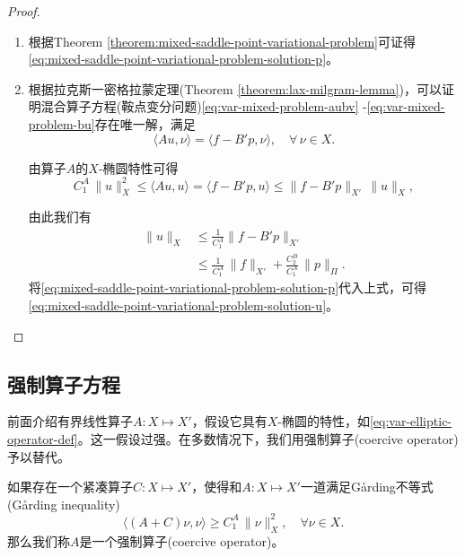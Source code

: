 \begin{proof}
  \begin{enumerate}
    \item 根据Theorem \ref{theorem:mixed-saddle-point-variational-problem}可证得\eqref{eq:mixed-saddle-point-variational-problem-solution-p}。
    \item 根据拉克斯一密格拉蒙定理(Theorem \ref{theorem:lax-milgram-lemma})，可以证明混合算子方程(鞍点变分问题)\eqref{eq:var-mixed-problem-aubv}
  -\eqref{eq:var-mixed-problem-bu}存在唯一解，满足
  \begin{equation*}
    \langle A u, \nu \rangle = \langle f - B' p, \nu \rangle, \quad \forall \, \nu \in X.
  \end{equation*}

  由算子$A$的$X$-椭圆特性可得
  \begin{equation*}
    C_1^A \, \big\|u\big\|_{X}^2 \le \langle Au, u \rangle = \langle f - B'p, u \rangle \le \big\| f - B' p \big\|_{X'} \, \big\|u \big\|_{X},
  \end{equation*}

  由此我们有
  \begin{equation*}
    \begin{split}
      \big\| u \big\|_{X} & \le \frac{1}{C_1^A}  \big\| f - B' p \big\|_{X'} \\
      & \le \frac{1}{C_1^A} \, \big\| f \big\|_{X'} + \frac{C_2^B}{C_1^A} \, \big\| p \big\|_{\Pi}.
    \end{split}
  \end{equation*}
  将\eqref{eq:mixed-saddle-point-variational-problem-solution-p}代入上式，可得\eqref{eq:mixed-saddle-point-variational-problem-solution-u}。
\end{enumerate}
\end{proof}

\subsection{强制算子方程}
\label{sec:var-coercive}
前面介绍有界线性算子$A:X \mapsto X'$，假设它具有$X$-椭圆的特性，如\eqref{eq:var-elliptic-operator-def}。这一假设过强。在多数情况下，我们用强制算子(coercive operator)予以替代。

\begin{definition}[强制算子]
  \label{definitiuon:var-coercive-def}
  如果存在一个紧凑算子$C:X \mapsto X'$，使得和$A:X \mapsto X'$一道满足Gårding不等式(Gårding inequality)
  \begin{equation}
    \label{eq:var-coercive-garding-inequality}
    \langle \left(A + C \right) \nu, \nu \rangle \ge C_1^A \, \big\| \nu \big\|_{X}^2, \quad \forall \nu \in X.
  \end{equation}
  那么我们称$A$是一个强制算子(coercive operator)。
\end{definition}

